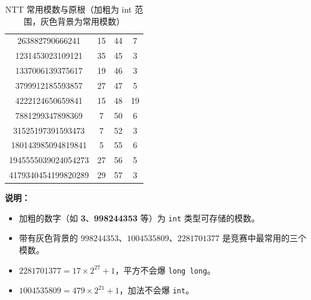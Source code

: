 \begin{table}[htbp]
\begin{tabular}{|c|c|c|c|}
263882790666241 & 15 & 44 & 7 \\
1231453023109121 & 35 & 45 & 3 \\
1337006139375617 & 19 & 46 & 3 \\
3799912185593857 & 27 & 47 & 5 \\
4222124650659841 & 15 & 48 & 19 \\
7881299347898369 & 7 & 50 & 6 \\
31525197391593473 & 7 & 52 & 3 \\
180143985094819841 & 5 & 55 & 6 \\
1945555039024054273 & 27 & 56 & 5 \\
4179340454199820289 & 29 & 57 & 3 \\
\hline
\end{tabular}
\caption{NTT 常用模数与原根（加粗为 int 范围，灰色背景为常用模数）}
\end{table}

\par
\textbf{说明：}

\begin{itemize}
    \item 加粗的数字（如 \textbf{3}、\textbf{998244353} 等）为 \texttt{int} 类型可存储的模数。
    \item 带有灰色背景的 $998244353$、$1004535809$、$2281701377$ 是竞赛中最常用的三个模数。
    \item $2281701377 = 17\times 2^{27}+1$，平方不会爆 \texttt{long long}。
    \item $1004535809 = 479\times 2^{21}+1$，加法不会爆 \texttt{int}。
\end{itemize}